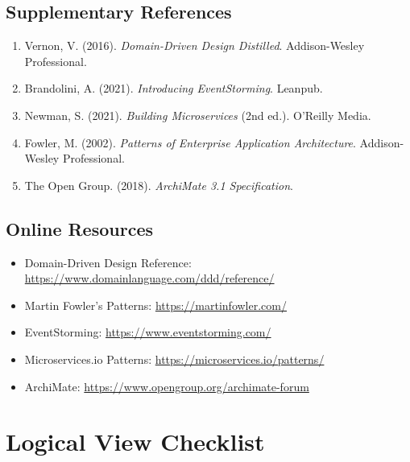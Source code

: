 \documentclass[11pt,letterpaper]{article}
\begin{document}
\subsection{Supplementary References}

\begin{enumerate}[resume]
    \item Vernon, V. (2016). \textit{Domain-Driven Design Distilled}. Addison-Wesley Professional.
    
    \item Brandolini, A. (2021). \textit{Introducing EventStorming}. Leanpub.
    
    \item Newman, S. (2021). \textit{Building Microservices} (2nd ed.). O'Reilly Media.
    
    \item Fowler, M. (2002). \textit{Patterns of Enterprise Application Architecture}. Addison-Wesley Professional.
    
    \item The Open Group. (2018). \textit{ArchiMate 3.1 Specification}.
\end{enumerate}

\subsection{Online Resources}

\begin{itemize}
    \item Domain-Driven Design Reference: \url{https://www.domainlanguage.com/ddd/reference/}
    \item Martin Fowler's Patterns: \url{https://martinfowler.com/}
    \item EventStorming: \url{https://www.eventstorming.com/}
    \item Microservices.io Patterns: \url{https://microservices.io/patterns/}
    \item ArchiMate: \url{https://www.opengroup.org/archimate-forum}
\end{itemize}

\appendix

\section{Logical View Checklist}
\end{document}
